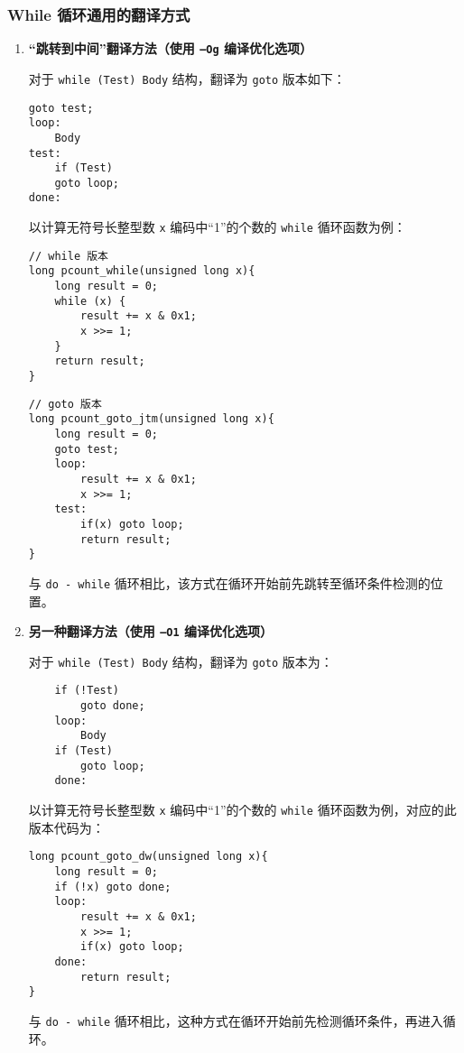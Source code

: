 \subsubsection{While 循环通用的翻译方式}
\begin{enumerate}
    \item \textbf{“跳转到中间”翻译方法（使用 \texttt{–Og} 编译优化选项）}

          对于 \texttt{while (Test) Body} 结构，翻译为 \texttt{goto} 版本如下：
          \begin{verbatim}
goto test;
loop:
    Body
test:
    if (Test)
    goto loop;
done:
\end{verbatim}
          以计算无符号长整型数 \texttt{x} 编码中“1”的个数的 \texttt{while} 循环函数为例：
          \begin{multicols}{2}
              \begin{verbatim}
// while 版本
long pcount_while(unsigned long x){
    long result = 0;
    while (x) {
        result += x & 0x1;
        x >>= 1;
    }
    return result;
}
\end{verbatim}
              \columnbreak
              \begin{verbatim}
// goto 版本
long pcount_goto_jtm(unsigned long x){
    long result = 0;
    goto test;
    loop:
        result += x & 0x1;
        x >>= 1;
    test:
        if(x) goto loop;
        return result;
}
\end{verbatim}
          \end{multicols}

          与 \texttt{do - while} 循环相比，该方式在循环开始前先跳转至循环条件检测的位置。
    \item \textbf{另一种翻译方法（使用 \texttt{–O1} 编译优化选项）}

          对于 \texttt{while (Test) Body} 结构，翻译为 \texttt{goto} 版本为：
          \begin{verbatim}
    if (!Test)
        goto done;
    loop:
        Body
    if (Test)
        goto loop;
    done:
\end{verbatim}
          以计算无符号长整型数 \texttt{x} 编码中“1”的个数的 \texttt{while} 循环函数为例，对应的此版本代码为：
          \begin{verbatim}
long pcount_goto_dw(unsigned long x){
    long result = 0;
    if (!x) goto done;
    loop:
        result += x & 0x1;
        x >>= 1;
        if(x) goto loop;
    done:
        return result;
}
\end{verbatim}
          与 \texttt{do - while} 循环相比，这种方式在循环开始前先检测循环条件，再进入循环。
\end{enumerate}

